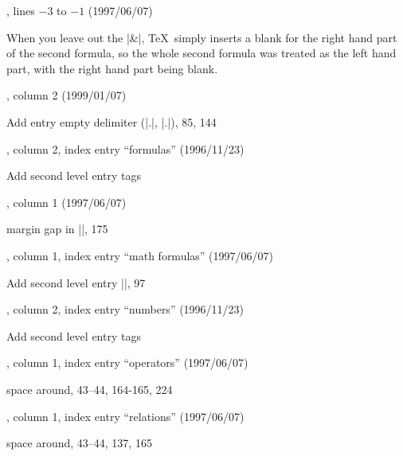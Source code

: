 , lines $-3$ to $-1$ (1997/06/07)

\noindent
When you leave out the |&|, \TeX\ simply inserts a blank for the right
hand part of the second formula, so the whole second formula was treated
as the left hand part, with the right hand part being blank.

, column 2 (1999/01/07)

Add entry\newline
empty delimiter (|\left.|, |\right.|), 85, 144

, column 2, index entry ``formulas'' (1996/11/23)

Add second level entry\newline
{} tags

, column 1 (1997/06/07)

\noindent
margin gap in |\multline|, 175

, column 1, index entry ``math formulas'' (1997/06/07)

Add second level entry\newline
\indent|\tag|, 97

, column 2, index entry ``numbers'' (1996/11/23)

Add second level entry\newline
{} tags

, column 1, index entry ``operators'' (1997/06/07)

\indent space around, 43--44, 164-165, 224

, column 1, index entry ``relations'' (1997/06/07)

\indent space around, 43--44, 137, 165

\enddocument
